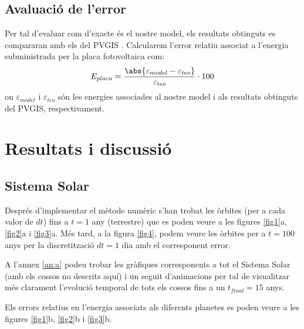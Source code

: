\documentclass[10pt, twoside, a4paper]{article}
\begin{document}
\subsection{Avaluació de l'error}
Per tal d'evaluar com d'exacte és el nostre model, els resultats obtinguts es compararan amb els del PVGIS \cite{ref7}. Calcularem l'error relatiu associat a l'energia subministrada per la placa fotovoltaica com:
\begin{equation}
    E_{placa} = \frac{\abs{\varepsilon_{model}-\varepsilon_{teo}}}{\varepsilon_{teo}}\cdot 100
\end{equation}
on $\varepsilon_{model}$ i $\varepsilon_{teo}$ són les energies associades al nostre model i als resultats obtinguts del PVGIS, respectivament.

\section{Resultats i discussió}

\subsection{Sistema Solar}
Després d'implementar el mètode numèric s'han trobat les òrbites (per a cada valor de $dt$) fins a $t=1$ any (terrestre) que es poden veure a les figures \ref{fig1}a, \ref{fig2}a i \ref{fig3}a. Més tard, a la figura \ref{fig4}, podem veure les òrbites per a $t=100$ anys per la discretització $dt=1$ dia amb el corresponent error.
 
A l'annex \ref{an:a} podeu trobar les gràfiques corresponents a tot el Sistema Solar (amb els cossos no descrits aquí) i un seguit d'animacions per tal de visualitzar més clarament l'evolució temporal de tots els cossos fins a un $t_{final}=15$ anys.

Els errors relatius en l'energia associats als diferents planetes es poden veure a les figures \ref{fig1}b, \ref{fig2}b i \ref{fig3}b.
\end{document}
